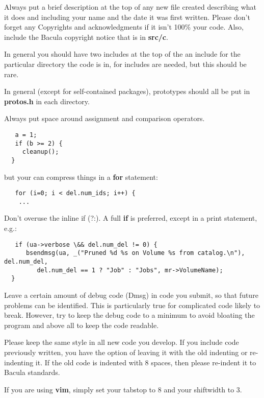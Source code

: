 Always put a brief description at the top of any new file created describing
what it does and including your name and the date it was first written. Please
don't forget any Copyrights and acknowledgments if it isn't 100\% your code.
Also, include the Bacula copyright notice that is in {\bf src/c}. 

In general you should have two includes at the top of the an include for the
particular directory the code is in, for includes are needed, but this should
be rare. 

In general (except for self-contained packages), prototypes should all be put
in {\bf protos.h} in each directory. 

Always put space around assignment and comparison operators. 

\footnotesize
\begin{verbatim}
   a = 1;
   if (b >= 2) {
     cleanup();
  }
\end{verbatim}
\normalsize

but your can compress things in a {\bf for} statement: 

\footnotesize
\begin{verbatim}
   for (i=0; i < del.num_ids; i++) {
    ...
\end{verbatim}
\normalsize

Don't overuse the inline if (?:). A full {\bf if} is preferred, except in a
print statement, e.g.: 

\footnotesize
\begin{verbatim}
   if (ua->verbose \&& del.num_del != 0) {
      bsendmsg(ua, _("Pruned %d %s on Volume %s from catalog.\n"), del.num_del,
         del.num_del == 1 ? "Job" : "Jobs", mr->VolumeName);
  }
\end{verbatim}
\normalsize

Leave a certain amount of debug code (Dmsg) in code you submit, so that future
problems can be identified. This is particularly true for complicated code
likely to break. However, try to keep the debug code to a minimum to avoid
bloating the program and above all to keep the code readable. 

Please keep the same style in all new code you develop. If you include code
previously written, you have the option of leaving it with the old indenting
or re-indenting it. If the old code is indented with 8 spaces, then please
re-indent it to Bacula standards. 

If you are using {\bf vim}, simply set your tabstop to 8 and your shiftwidth
to 3. 

